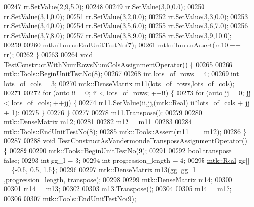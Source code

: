 \begin{DoxyCode}
00247   rr.SetValue(2,9,5.0);
00248 
00249   rr.SetValue(3,0,0.0);
00250   rr.SetValue(3,1,0.0);
00251   rr.SetValue(3,2,0.0);
00252   rr.SetValue(3,3,0.0);
00253   rr.SetValue(3,4,0.0);
00254   rr.SetValue(3,5,6.0);
00255   rr.SetValue(3,6,7.0);
00256   rr.SetValue(3,7,8.0);
00257   rr.SetValue(3,8,9.0);
00258   rr.SetValue(3,9,10.0);
00259 
00260   \hyperlink{classmtk_1_1Tools_aba67d9dc35c9c1c49430fcc9ea035e03}{mtk::Tools::EndUnitTestNo}(7);
00261   \hyperlink{classmtk_1_1Tools_ac6804df469c94ab6a796fb64f1e44a89}{mtk::Tools::Assert}(m10 == rr);
00262 \}
00263 
00264 \textcolor{keywordtype}{void} TestConstructWithNumRowsNumColsAssignmentOperator() \{
00265 
00266   \hyperlink{classmtk_1_1Tools_afc29ecaf337a13ed2e817d3890a5a441}{mtk::Tools::BeginUnitTestNo}(8);
00267 
00268   \textcolor{keywordtype}{int} lots\_of\_rows = 4;
00269   \textcolor{keywordtype}{int} lots\_of\_cols = 3;
00270   \hyperlink{classmtk_1_1DenseMatrix}{mtk::DenseMatrix} m11(lots\_of\_rows,lots\_of\_cols);
00271 
00272   \textcolor{keywordflow}{for} (\textcolor{keyword}{auto} ii = 0; ii < lots\_of\_rows; ++ii) \{
00273     \textcolor{keywordflow}{for} (\textcolor{keyword}{auto} jj = 0; jj < lots\_of\_cols; ++jj) \{
00274       m11.SetValue(ii,jj,(\hyperlink{group__c01-roots_gac080bbbf5cbb5502c9f00405f894857d}{mtk::Real}) ii*lots\_of\_cols + jj + 1);
00275     \}
00276   \}
00277 
00278   m11.Transpose();
00279 
00280   \hyperlink{classmtk_1_1DenseMatrix}{mtk::DenseMatrix} m12;
00281 
00282   m12 = m11;
00283 
00284   \hyperlink{classmtk_1_1Tools_aba67d9dc35c9c1c49430fcc9ea035e03}{mtk::Tools::EndUnitTestNo}(8);
00285   \hyperlink{classmtk_1_1Tools_ac6804df469c94ab6a796fb64f1e44a89}{mtk::Tools::Assert}(m11 == m12);
00286 \}
00287 
00288 \textcolor{keywordtype}{void} TestConstructAsVandermondeTransposeAssignmentOperator() \{
00289 
00290   \hyperlink{classmtk_1_1Tools_afc29ecaf337a13ed2e817d3890a5a441}{mtk::Tools::BeginUnitTestNo}(9);
00291 
00292   \textcolor{keywordtype}{bool} transpose = \textcolor{keyword}{false};
00293   \textcolor{keywordtype}{int} gg\_l = 3;
00294   \textcolor{keywordtype}{int} progression\_length = 4;
00295   \hyperlink{group__c01-roots_gac080bbbf5cbb5502c9f00405f894857d}{mtk::Real} gg[] = \{-0.5, 0.5, 1.5\};
00296 
00297   \hyperlink{classmtk_1_1DenseMatrix}{mtk::DenseMatrix} m13(gg, gg\_l ,progression\_length, transpose);
00298 
00299   \hyperlink{classmtk_1_1DenseMatrix}{mtk::DenseMatrix} m14;
00300 
00301   m14 = m13;
00302 
00303   m13.\hyperlink{classmtk_1_1DenseMatrix_a71d9c07ca66e88d97d1fd5012f43138b}{Transpose}();
00304 
00305   m14 = m13;
00306 
00307   \hyperlink{classmtk_1_1Tools_aba67d9dc35c9c1c49430fcc9ea035e03}{mtk::Tools::EndUnitTestNo}(9);

\end{DoxyCode}
